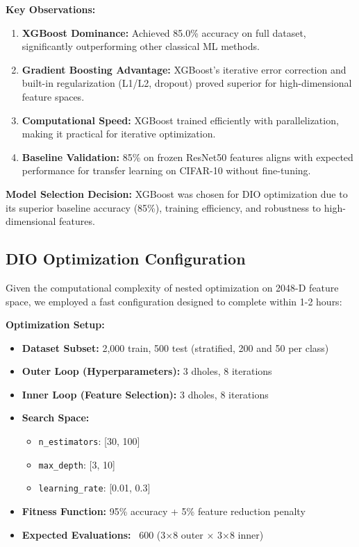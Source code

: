 \documentclass[12pt, a4paper]{article}
\begin{document}
\textbf{Key Observations:}
\begin{enumerate}
    \item \textbf{XGBoost Dominance:} Achieved 85.0\% accuracy on full dataset, significantly outperforming other classical ML methods.
    \item \textbf{Gradient Boosting Advantage:} XGBoost's iterative error correction and built-in regularization (L1/L2, dropout) proved superior for high-dimensional feature spaces.
    \item \textbf{Computational Speed:} XGBoost trained efficiently with parallelization, making it practical for iterative optimization.
    \item \textbf{Baseline Validation:} 85\% on frozen ResNet50 features aligns with expected performance for transfer learning on CIFAR-10 without fine-tuning.
\end{enumerate}

\textbf{Model Selection Decision:} XGBoost was chosen for DIO optimization due to its superior baseline accuracy (85\%), training efficiency, and robustness to high-dimensional features.

\subsection{DIO Optimization Configuration}

Given the computational complexity of nested optimization on 2048-D feature space, we employed a fast configuration designed to complete within 1-2 hours:

\textbf{Optimization Setup:}
\begin{itemize}
    \item \textbf{Dataset Subset:} 2,000 train, 500 test (stratified, 200 and 50 per class)
    \item \textbf{Outer Loop (Hyperparameters):} 3 dholes, 8 iterations
    \item \textbf{Inner Loop (Feature Selection):} 3 dholes, 8 iterations
    \item \textbf{Search Space:}
    \begin{itemize}
        \item \texttt{n\_estimators}: [30, 100]
        \item \texttt{max\_depth}: [3, 10]
        \item \texttt{learning\_rate}: [0.01, 0.3]
    \end{itemize}
    \item \textbf{Fitness Function:} 95\% accuracy + 5\% feature reduction penalty
    \item \textbf{Expected Evaluations:} ~600 (3×8 outer × 3×8 inner)
\end{itemize}
\end{document}
